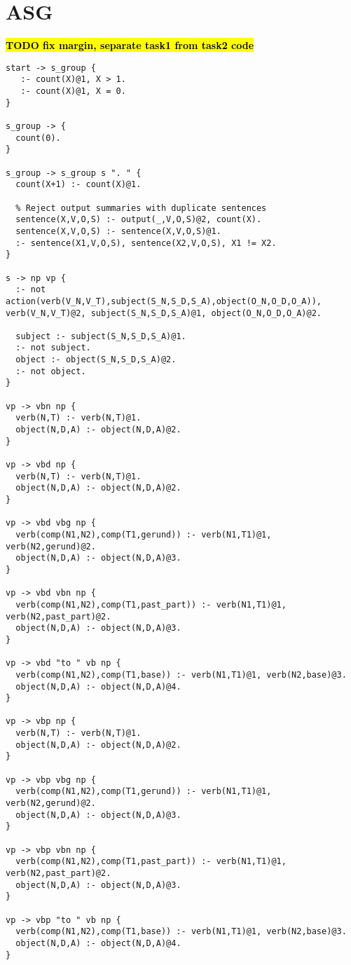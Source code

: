 \chapter{ASG}

\textcolor{red}{\textbf{\hl{TODO fix margin, separate task1 from task2 code}}}

\begin{lstlisting}
start -> s_group {
   :- count(X)@1, X > 1.
   :- count(X)@1, X = 0.
}

s_group -> {
  count(0).
}

s_group -> s_group s ". " {
  count(X+1) :- count(X)@1.

  % Reject output summaries with duplicate sentences
  sentence(X,V,O,S) :- output(_,V,O,S)@2, count(X).
  sentence(X,V,O,S) :- sentence(X,V,O,S)@1.
  :- sentence(X1,V,O,S), sentence(X2,V,O,S), X1 != X2.
}

s -> np vp {
  :- not action(verb(V_N,V_T),subject(S_N,S_D,S_A),object(O_N,O_D,O_A)), verb(V_N,V_T)@2, subject(S_N,S_D,S_A)@1, object(O_N,O_D,O_A)@2.

  subject :- subject(S_N,S_D,S_A)@1.
  :- not subject.
  object :- object(S_N,S_D,S_A)@2.
  :- not object.
}

vp -> vbn np {
  verb(N,T) :- verb(N,T)@1.
  object(N,D,A) :- object(N,D,A)@2.
}

vp -> vbd np {
  verb(N,T) :- verb(N,T)@1.
  object(N,D,A) :- object(N,D,A)@2.
}

vp -> vbd vbg np {
  verb(comp(N1,N2),comp(T1,gerund)) :- verb(N1,T1)@1, verb(N2,gerund)@2.
  object(N,D,A) :- object(N,D,A)@3.
}

vp -> vbd vbn np {
  verb(comp(N1,N2),comp(T1,past_part)) :- verb(N1,T1)@1, verb(N2,past_part)@2.
  object(N,D,A) :- object(N,D,A)@3.
}

vp -> vbd "to " vb np {
  verb(comp(N1,N2),comp(T1,base)) :- verb(N1,T1)@1, verb(N2,base)@3.
  object(N,D,A) :- object(N,D,A)@4.
}

vp -> vbp np {
  verb(N,T) :- verb(N,T)@1.
  object(N,D,A) :- object(N,D,A)@2.
}

vp -> vbp vbg np {
  verb(comp(N1,N2),comp(T1,gerund)) :- verb(N1,T1)@1, verb(N2,gerund)@2.
  object(N,D,A) :- object(N,D,A)@3.
}

vp -> vbp vbn np {
  verb(comp(N1,N2),comp(T1,past_part)) :- verb(N1,T1)@1, verb(N2,past_part)@2.
  object(N,D,A) :- object(N,D,A)@3.
}

vp -> vbp "to " vb np {
  verb(comp(N1,N2),comp(T1,base)) :- verb(N1,T1)@1, verb(N2,base)@3.
  object(N,D,A) :- object(N,D,A)@4.
}


\end{lstlisting}
